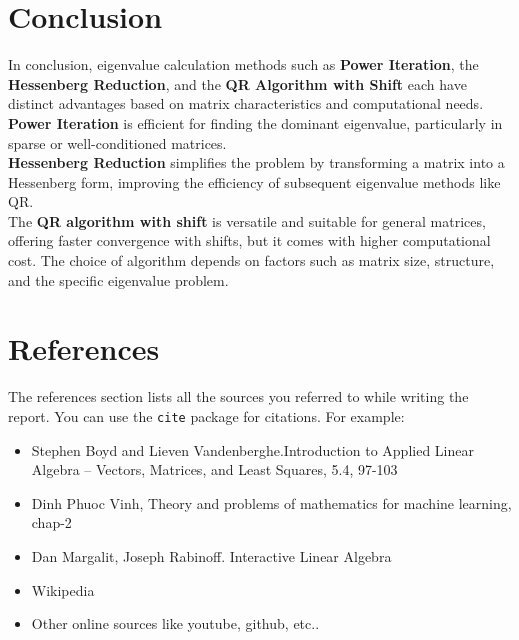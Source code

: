 \documentclass[12pt]{article}
\begin{document}
\section{Conclusion}
In conclusion, eigenvalue calculation methods such as \textbf{Power Iteration}, the \textbf{Hessenberg Reduction}, and the \textbf{QR Algorithm with Shift} each have distinct advantages based on matrix characteristics and computational needs.\\
\textbf{Power Iteration} is efficient for finding the dominant eigenvalue, particularly in sparse or well-conditioned matrices.\\ 
\textbf{Hessenberg Reduction} simplifies the problem by transforming a matrix into a Hessenberg form, improving the efficiency of subsequent eigenvalue methods like QR.\\ 
The \textbf{QR algorithm with shift} is versatile and suitable for general matrices, offering faster convergence with shifts, but it comes with higher computational cost. The choice of algorithm depends on factors such as matrix size, structure, and the specific eigenvalue problem.

\section{References}
The references section lists all the sources you referred to while writing the report. You can use the \texttt{cite} package for citations. For example:

\begin{itemize}
    \item Stephen Boyd and Lieven Vandenberghe.Introduction to Applied Linear Algebra – Vectors, Matrices, and Least Squares, 5.4, 97-103
    \item Dinh Phuoc Vinh, Theory and problems of mathematics for machine learning, chap-2
    \item Dan Margalit, Joseph Rabinoff. Interactive Linear Algebra
    \item Wikipedia
    \item Other online sources like youtube, github, etc..
\end{itemize}

\end{document}
